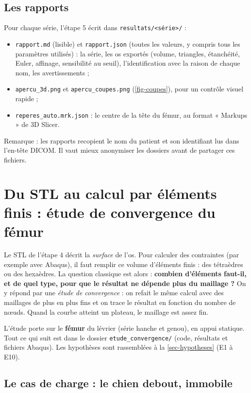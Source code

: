 \documentclass[11pt,a4paper]{article}
\newcommand{\fichier}[1]{\texttt{\small #1}}
\begin{document}
\subsection{Les rapports}

Pour chaque série, l'étape 5 écrit dans \fichier{resultats/<série>/} :
\begin{itemize}
  \item \fichier{rapport.md} (lisible) et \fichier{rapport.json} (toutes les valeurs, y compris tous les paramètres
  utilisés) : la série, les os exportés (volume, triangles, étanchéité, Euler, affinage, sensibilité au seuil),
  l'identification avec la raison de chaque nom, les avertissements ;
  \item \fichier{apercu\_3d.png} et \fichier{apercu\_coupes.png} (\cref{fig-coupes}), pour un contrôle visuel rapide ;
  \item \fichier{reperes\_auto.mrk.json} : le centre de la tête du fémur, au format « Markups » de 3D Slicer.
\end{itemize}
Remarque : les rapports recopient le nom du patient et son identifiant lus dans l'en-tête DICOM. Il vaut mieux
anonymiser les dossiers avant de partager ces fichiers.

\section{Du STL au calcul par éléments finis : étude de convergence du fémur}
\label{sec-convergence}

Le STL de l'étape 4 décrit la \emph{surface} de l'os. Pour calculer des contraintes (par exemple avec Abaqus), il faut
remplir ce volume d'éléments finis : des tétraèdres ou des hexaèdres. La question classique est alors : \textbf{combien
d'éléments faut-il, et de quel type, pour que le résultat ne dépende plus du maillage ?} On y répond par une
\emph{étude de convergence} : on refait le même calcul avec des maillages de plus en plus fins et on trace le résultat en
fonction du nombre de nœuds. Quand la courbe atteint un plateau, le maillage est assez fin.

L'étude porte sur le \textbf{fémur} du lévrier (série hanche et genou), en appui statique. Tout ce qui suit est dans le
dossier \fichier{etude\_convergence/} (code, résultats et fichiers Abaqus). Les hypothèses sont rassemblées à la
\cref{sec-hypotheses} (E1 à E10).

\subsection{Le cas de charge : le chien debout, immobile}
\label{sec-cas}
\end{document}
